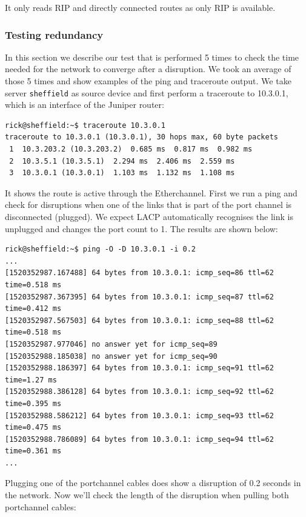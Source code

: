 \documentclass[10pt,a4paper]{article}
\begin{document}
It only reads RIP and directly connected routes as only RIP is available.

\subsubsection{Testing redundancy}
In this section we describe our test that is performed 5 times to check the time needed for the network to converge after a disruption. We took an average of those 5 times and show examples of the ping and traceroute output. We take server \texttt{sheffield} as source device and first perform a traceroute to 10.3.0.1, which is an interface of the Juniper router:

\begin{verbatim}
rick@sheffield:~$ traceroute 10.3.0.1
traceroute to 10.3.0.1 (10.3.0.1), 30 hops max, 60 byte packets
 1  10.3.203.2 (10.3.203.2)  0.685 ms  0.817 ms  0.982 ms
 2  10.3.5.1 (10.3.5.1)  2.294 ms  2.406 ms  2.559 ms
 3  10.3.0.1 (10.3.0.1)  1.103 ms  1.132 ms  1.108 ms
\end{verbatim}

It shows the route is active through the Etherchannel. First we run a ping and check for disruptions when one of the links that is part of the port channel is disconnected (plugged). We expect LACP automatically recognises the link is unplugged and changes the port count to 1. The results are shown below:
\begin{verbatim}
rick@sheffield:~$ ping -O -D 10.3.0.1 -i 0.2
...
[1520352987.167488] 64 bytes from 10.3.0.1: icmp_seq=86 ttl=62 time=0.518 ms
[1520352987.367395] 64 bytes from 10.3.0.1: icmp_seq=87 ttl=62 time=0.412 ms
[1520352987.567503] 64 bytes from 10.3.0.1: icmp_seq=88 ttl=62 time=0.518 ms
[1520352987.977046] no answer yet for icmp_seq=89
[1520352988.185038] no answer yet for icmp_seq=90
[1520352988.186397] 64 bytes from 10.3.0.1: icmp_seq=91 ttl=62 time=1.27 ms
[1520352988.386128] 64 bytes from 10.3.0.1: icmp_seq=92 ttl=62 time=0.395 ms
[1520352988.586212] 64 bytes from 10.3.0.1: icmp_seq=93 ttl=62 time=0.475 ms
[1520352988.786089] 64 bytes from 10.3.0.1: icmp_seq=94 ttl=62 time=0.361 ms
...
\end{verbatim}

Plugging one of the portchannel cables does show a disruption of 0.2 seconds in the network. Now we'll check the length of the disruption when pulling both portchannel cables:
\end{document}
